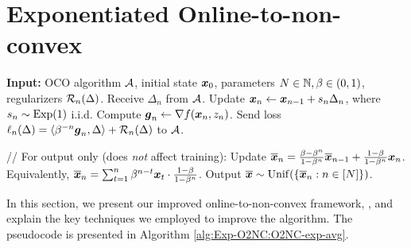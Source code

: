 \section{Exponentiated Online-to-non-convex}
\label{sec:Exp-O2NC_alg}

\begin{algorithm}[t]
\caption{Exponentiated O2NC}
\label{alg:Exp-O2NC:O2NC-exp-avg}
\begin{algorithmic}[1]
    \State \textbf{Input:} OCO algorithm ${\cal A}$, initial state ${\boldsymbol{x}}_0$, parameters $N\in\mathbb N, \beta\in (0,1)$, regularizers ${\cal R}_n(\Delta)$.
        \State Receive $\Delta_n$ from ${\cal A}$.
        \State Update ${\boldsymbol{x}}_n \gets {\boldsymbol{x}}_{n-1} + s_n\Delta_n$, where $s_n\sim\mathrm{Exp}(1)$ i.i.d.
        \State Compute ${\boldsymbol{g}}_n \gets \nabla f({\boldsymbol{x}}_n, z_n)$.
        \State Send loss $\ell_n(\Delta) = \langle \beta^{-n}{\boldsymbol{g}}_n, \Delta\rangle + {\cal R}_n(\Delta)$ to ${\cal A}$.
        
        // For output only (does \textit{not} affect training):
        \State Update $\overline{{\boldsymbol{x}}}_n = \frac{\beta-\beta^n}{1-\beta^n}\overline{{\boldsymbol{x}}}_{n-1} + \frac{1-\beta}{1-\beta^n}{\boldsymbol{x}}_n$. \\
        Equivalently, $\overline {{\boldsymbol{x}}}_n = \sum_{t=1}^n \beta^{n-t}{\boldsymbol{x}}_t\cdot \frac{1-\beta}{1-\beta^n}$.
    \EndFor
    \State Output $\overline {{\boldsymbol{x}}} \sim \mathrm{Unif}(\{\overline{{\boldsymbol{x}}}_n:n\in[N]\})$.
\end{algorithmic}
\end{algorithm}





In this section, we present our improved online-to-non-convex framework, \alg, and explain the key techniques we employed to improve the algorithm. The pseudocode is presented in Algorithm \ref{alg:Exp-O2NC:O2NC-exp-avg}.


